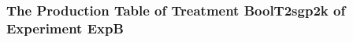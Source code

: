  \begin{frame}
 \fontsize{8pt}{9pt}\selectfont
 \frametitle{ The Production Table of Treatment BoolT2sgp2k of Experiment ExpB }

 \label{ExpBGrammarTable010.tex}  
 \end{frame}

